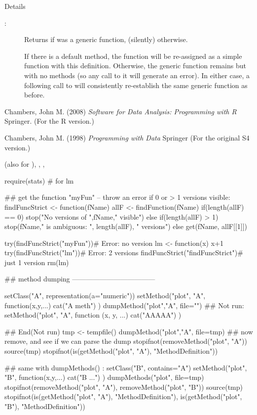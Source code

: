 \begin{Section}{Details}
\begin{description}
\item[:] 
Returns  if  was a generic function,
 (silently) otherwise.

If there is a default method, the function will be re-assigned as
a simple function with this definition.
Otherwise, the generic function remains but with no methods (so
any call to it will generate an error).  In either case, a
following call to  will consistently
re-establish the same generic function as before.


\end{description}

\end{Section}
%
\begin{References}\relax
Chambers, John M. (2008)
\emph{Software for Data Analysis: Programming with R}
Springer.  (For the R version.)

Chambers, John M. (1998)
\emph{Programming with Data}
Springer (For the original S4 version.)
\end{References}
%
\begin{SeeAlso}\relax
{} (also for ),
,
,
\end{SeeAlso}
%
\begin{Examples}
\begin{ExampleCode}
require(stats) # for lm

## get the function "myFun" -- throw an error if 0 or > 1 versions visible:
findFuncStrict <- function(fName) {
  allF <- findFunction(fName)
  if(length(allF) == 0)
    stop("No versions of ",fName," visible")
  else if(length(allF) > 1)
    stop(fName," is ambiguous: ", length(allF), " versions")
  else
    get(fName, allF[[1]])
}

try(findFuncStrict("myFun"))# Error: no version
lm <- function(x) x+1
try(findFuncStrict("lm"))#    Error: 2 versions
findFuncStrict("findFuncStrict")# just 1 version
rm(lm)



## method dumping ------------------------------------

setClass("A", representation(a="numeric"))
setMethod("plot", "A", function(x,y,...){ cat("A meth\n") })
dumpMethod("plot","A", file="")
## Not run: 
setMethod("plot", "A",
function (x, y, ...)
{
    cat("AAAAA\n")
}
)

## End(Not run)
tmp <- tempfile()
dumpMethod("plot","A", file=tmp)
## now remove, and see if we can parse the dump
stopifnot(removeMethod("plot", "A"))
source(tmp)
stopifnot(is(getMethod("plot", "A"), "MethodDefinition"))

## same with dumpMethods() :
setClass("B", contains="A")
setMethod("plot", "B", function(x,y,...){ cat("B ...\n") })
dumpMethods("plot", file=tmp)
stopifnot(removeMethod("plot", "A"),
          removeMethod("plot", "B"))
source(tmp)
stopifnot(is(getMethod("plot", "A"), "MethodDefinition"),
          is(getMethod("plot", "B"), "MethodDefinition"))
\end{ExampleCode}
\end{Examples}
